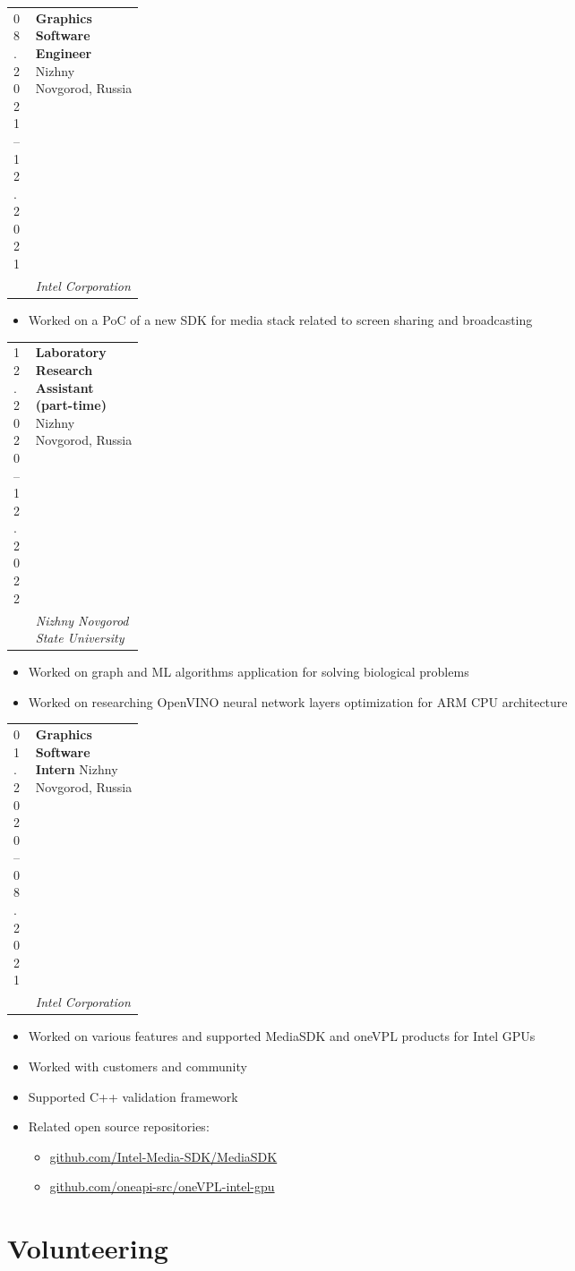 \documentclass[11pt,a4paper]{article}
\makeatletter
\newcommand{\muted}[1]{{\color{Muted}#1}}
\newcommand{\cventry}[5]{%
  \par\noindent
  \begin{tabularx}{\linewidth}{@{}p{0.17\linewidth}@{\hspace{0.55em}}X@{}}
    \muted{\small #1} &
    {\textbf{#3} \hfill \muted{\small #4}}\\[-0.15em]
    & {\textit{#2}}\\
  \end{tabularx}\par
  #5
  \vspace{0.25em}
}
\newcommand{\cvbullets}[1]{%
  \begin{itemize}[leftmargin=1.4em, labelsep=0.5em]
    #1
  \end{itemize}
}
\makeatother
\begin{document}
\cventry
  {08.2021 -- 12.2021}
  {Intel Corporation}
  {Graphics Software Engineer}
  {Nizhny Novgorod, Russia}
  {\cvbullets{
    \item Worked on a PoC of a new SDK for media stack related to screen sharing and broadcasting
  }}

\cventry
  {12.2020 -- 12.2022}
  {Nizhny Novgorod State University}
  {Laboratory Research Assistant (part-time)}
  {Nizhny Novgorod, Russia}
  {\cvbullets{
    \item Worked on graph and ML algorithms application for solving biological problems
    \item Worked on researching OpenVINO neural network layers optimization for ARM CPU architecture
  }}

\cventry
  {01.2020 -- 08.2021}
  {Intel Corporation}
  {Graphics Software Intern}
  {Nizhny Novgorod, Russia}
  {\cvbullets{
    \item Worked on various features and supported MediaSDK and oneVPL products for Intel GPUs
    \item Worked with customers and community
    \item Supported C++ validation framework
    \item Related open source repositories:
      \begin{itemize}
        \item \href{https://github.com/Intel-Media-SDK/MediaSDK}{github.com/Intel-Media-SDK/MediaSDK}
        \item \href{https://github.com/oneapi-src/oneVPL-intel-gpu}{github.com/oneapi-src/oneVPL-intel-gpu}
      \end{itemize}
  }}

\section*{Volunteering}
\end{document}
